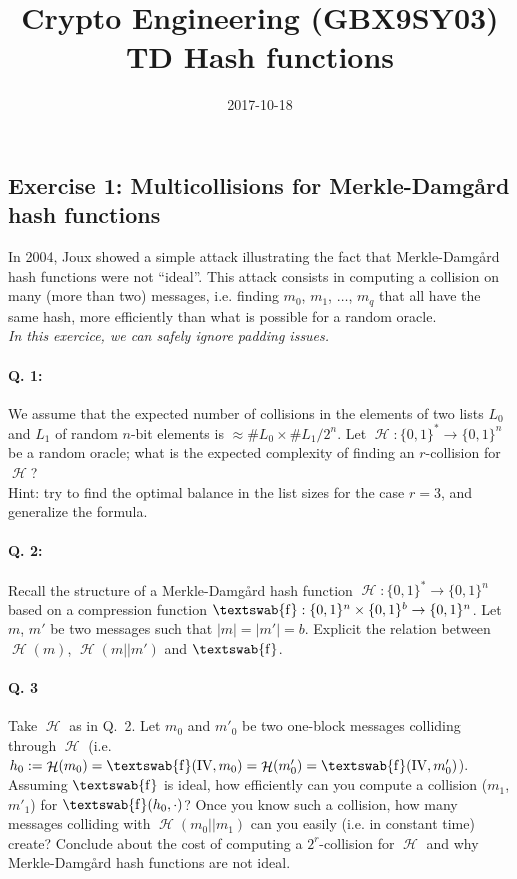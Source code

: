 \documentclass[11pt,a4paper]{article}
\title{Crypto Engineering (GBX9SY03)\\
TD Hash functions}
\date{2017-10-18}
\DeclareMathOperator\hash{\mathcal{H}}
\DeclareMathOperator\comp{\textswab{f}}
\begin{document}
\maketitle{}

\subsection*{Exercise 1: Multicollisions for Merkle-Damg\aa rd hash functions}
In 2004, Joux showed a simple attack illustrating the fact that Merkle-Damg\aa rd hash functions were not ``ideal''. This attack consists in computing a collision on many
(more than two) messages, i.e. finding $m_0$, $m_1$, $\ldots$, $m_q$ that all have the same hash, more efficiently than what is possible for a random oracle.\\
\emph{In this exercice, we can safely ignore padding issues.}

\paragraph{Q. 1:} We assume that the expected number of collisions in the elements of two lists $L_0$ and $L_1$ of random $n$-bit elements is $\approx \#L_0\times\#L_1/2^n$.
Let $\hash : \{0,1\}^* \rightarrow \{0,1\}^n$ be a random oracle; what is the expected complexity of finding an $r$-collision for $\hash$?\\
{\footnotesize Hint: try to find the optimal balance in the list sizes for the case $r = 3$, and generalize the formula.}

\paragraph{Q. 2:}  Recall the structure of a Merkle-Damg\aa rd hash function
$\hash : \{0,1\}^* \rightarrow \{0,1\}^n$ based on a compression function $\comp : \{0,1\}^n \times \{0,1\}^b \rightarrow \{0,1\}^n$.
Let $m$, $m'$ be two messages such that $|m| = |m'| = b$.
Explicit the relation between $\hash(m)$, $\hash(m||m')$ and $\comp$.

\paragraph{Q. 3} Take $\hash$ as in Q.~2. Let $m_0$ and $m'_0$ be two one-block messages colliding through $\hash$ (i.e. $h_0 :=
\hash(m_0) = \comp(\text{IV}, m_0) = \hash(m'_0) = \comp(\text{IV}, m'_0)$). Assuming $\comp$ is ideal, how efficiently can you compute a collision
($m_1$, $m'_1$) for $\comp(h_0, \cdot)$? Once you know such a collision, how many messages colliding with $\hash(m_0||m_1)$ can you easily (i.e. in
constant time) create? Conclude about the cost of
computing a $2^r$-collision for $\hash$ and why Merkle-Damg\aa rd hash functions are not ideal.
\end{document}
